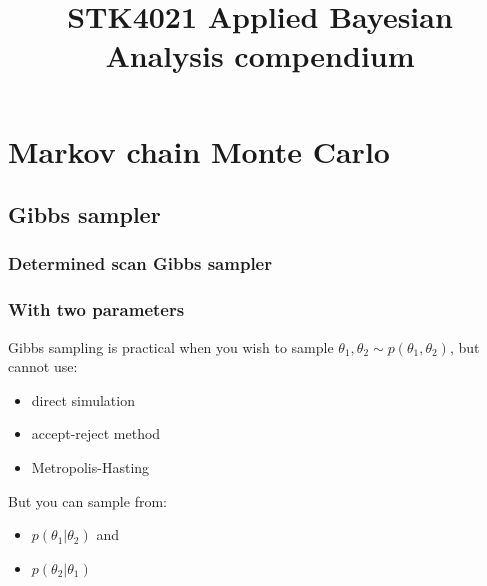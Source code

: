\documentclass{article}
\title{STK4021 Applied Bayesian Analysis compendium}
\author{}
\begin{document}
    \maketitle

    \tableofcontents

    \section{Markov chain Monte Carlo}

        \subsection{Gibbs sampler}

            \subsubsection{Determined scan Gibbs sampler}

                \subsubsection*{With two parameters}
                    Gibbs sampling is practical when you wish to sample $\theta_1, \theta_2 \sim p(\theta_1, \theta_2)$, but cannot use:
                    \begin{itemize}
                        \item direct simulation
                        \item accept-reject method
                        \item Metropolis-Hasting
                    \end{itemize}
                    But you can sample from:
                    \begin{itemize}
                        \item $p(\theta_1 | \theta_2)$ and
                        \item $p(\theta_2 | \theta_1)$
                    \end{itemize}
\end{document}
